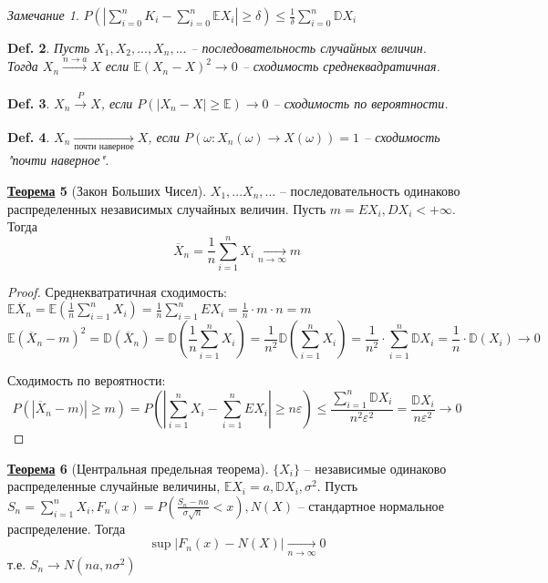 \documentclass[12pt]{article}
\def\E{\mathbb{E}}
\def\D{\mathbb{D}}
\theoremstyle{definition} %
\newtheorem{Thm}{\underline{Теорема}}[subsection] %
\theoremstyle{plain} %
\newtheorem{Def}[Thm]{Def.} %
\theoremstyle{remark} %
\newtheorem{Rem}[Thm]{Замечание} %
\begin{document}
\begin{Rem}
    $P(|\sum_{i=0}^{n} K_i - \sum_{i=0}^{n} \E X_i| \geqslant \delta) \leqslant \frac{1}{\delta}\sum_{i=0}^{n} \D X_i$ 
\end{Rem}

\begin{Def}
    Пусть $X_1, X_2, ..., X_n, ...$ -- последовательность случайных величин. \\
    Тогда $X_n \xrightarrow[]{n \to a} X$ если $\E(X_n - X)^2 \to 0$ -- сходимость среднеквадратичная.
\end{Def}

\begin{Def}
    $X_n \xrightarrow[]{P} X$, если $P(|X_n - X| \geqslant \E) \to 0$ -- сходимость по вероятности.
\end{Def}

\begin{Def}
    $X_n \xrightarrow[\text{почти наверное}]{} X$, если $P(\omega : X_n(\omega) \to X(\omega)) = 1$  -- сходимость "почти наверное".
\end{Def}

\begin{Thm}[Закон Больших Чисел]
    $X_1, ... X_n, ...$ -- последовательность одинаково распределенных независимых случайных величин. Пусть $m = EX_i, DX_i < +\infty$.
    Тогда 
    \[\overline{X}_n = \frac{1}{n}\sum_{i=1}^{n} X_i \xrightarrow[n \to \infty]{} m\] 
\end{Thm}

\begin{proof}
    Среднекватратичная сходимость: \\
    $\E \overline{X}_n = \E\left(\frac{1}{n} \sum_{i=1}^{n} X_i\right) = \frac{1}{n} \sum_{i=1}^{n} EX_i = \frac{1}{n} \cdot m \cdot n = m$ \\
    \[\E(\overline{X}_n - m)^2 = \D(\overline{X}_n) = \D\left(\frac{1}{n} \sum_{i=1}^{n} X_i\right) = \frac{1}{n^2}\D(\sum_{i=1}^{n} X_i) = \frac{1}{n^2} \cdot \sum_{i=1}^{n} \D X_i = \frac{1}{n} \cdot \D(X_i) \to 0\]

    Сходимость по вероятности: \\
    \[P(|\overline{X}_n - m)| \geqslant m) = P\left(\left|\sum_{i=1}^{n} X_i - \sum_{i=1}^{n} EX_i\right| \geqslant n \varepsilon\right) \leqslant \frac{\sum_{i=1}^{n} \D X_i}{n^2 \varepsilon^2} = \frac{\D X_i}{n \varepsilon^2} \to 0\]
\end{proof}

\begin{Thm}[Центральная предельная теорема]
    $\{X_i\}$ -- независимые одинаково распределенные случайные величины, $\E X_i = a, \D X_i, \sigma^2$.
    Пусть $S_n = \sum_{i=1}^{n} X_i, F_n(x) = P\left(\frac{S_n - na}{\sigma \sqrt{n}} < x \right), N(X)$ -- стандартное нормальное распределение. Тогда
    \[\sup |F_n(x) - N(X)| \xrightarrow[n \to \infty]{} 0\]   
    т.е. $S_n \to N(na, n \sigma^2)$ 
\end{Thm}
\end{document}
